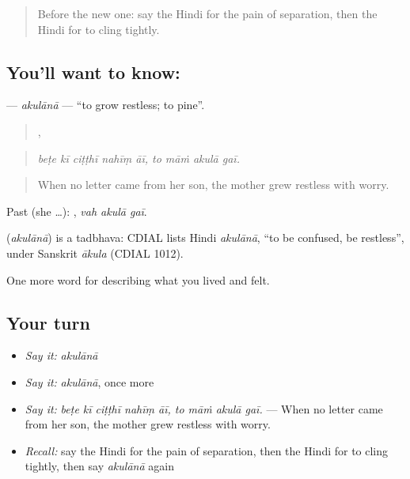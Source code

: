 \begin{quote}
Before the new one: say the Hindi for the pain of separation, then the Hindi for to cling tightly.
\end{quote}

\subsection*{You'll want to know: }
\textbf{} — \emph{akulānā} — \textquotedblleft{}to grow restless; to pine\textquotedblright{}.

\begin{quote}
    ,    
\end{quote}

\begin{quote}
\emph{beṭe kī ciṭṭhī nahīṃ āī, to māṁ akulā gaī.}
\end{quote}

\begin{quote}
When no letter came from her son, the mother grew restless with worry.
\end{quote}

Past (she …):   , \emph{vah akulā gaī}.

\begin{cousinweb}
\textbf{} (\emph{akulānā}) is a tadbhava: CDIAL lists Hindi \emph{akulānā}, \textquotedblleft{}to be confused, be restless\textquotedblright{}, under Sanskrit \emph{ākula} (CDIAL 1012).
\end{cousinweb}

\begin{grammarlens}[title={What you've built}]
One more word for describing what you lived and felt.
\end{grammarlens}

\subsection*{Your turn}
\begin{itemize}
\raggedright
  \item \emph{Say it:} \emph{akulānā}
  \item \emph{Say it:} \emph{akulānā}, once more
  \item \emph{Say it:} \emph{beṭe kī ciṭṭhī nahīṃ āī, to māṁ akulā gaī.} — When no letter came from her son, the mother grew restless with worry.
  \item \emph{Recall:} say the Hindi for the pain of separation, then the Hindi for to cling tightly, then say \emph{akulānā} again
\end{itemize}

